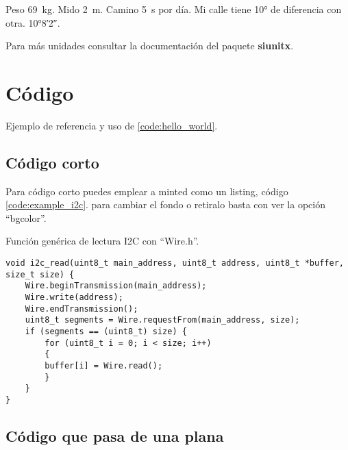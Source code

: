 Peso \si{69 \kilogram}.
Mido \si{2 \metre}.
Camino \si{5 \second} por día.
Mi calle tiene \ang{10} de diferencia con otra.
\ang{10;8;2}.

Para más unidades consultar la documentación del paquete 
\textbf{siunitx}.

\section{Código}
Ejemplo de referencia y uso de \ref{code:hello_world}.

\subsection{Código corto}
Para código corto puedes emplear a minted como un listing, código \ref{code:example_i2c}.
para cambiar el fondo o retiralo basta con ver la opción ``bgcolor''.

\begin{listing}[H]
    \caption{Función genérica de lectura I2C con ``Wire.h''.}
    \label{code:example_i2c}
    \begin{verbatim}
void i2c_read(uint8_t main_address, uint8_t address, uint8_t *buffer, size_t size) {
    Wire.beginTransmission(main_address);
    Wire.write(address);
    Wire.endTransmission();
    uint8_t segments = Wire.requestFrom(main_address, size);
    if (segments == (uint8_t) size) {
        for (uint8_t i = 0; i < size; i++)
        {
        buffer[i] = Wire.read();
        }  
    }
}
    \end{verbatim}
\end{listing}

\subsection{Código que pasa de una plana}

